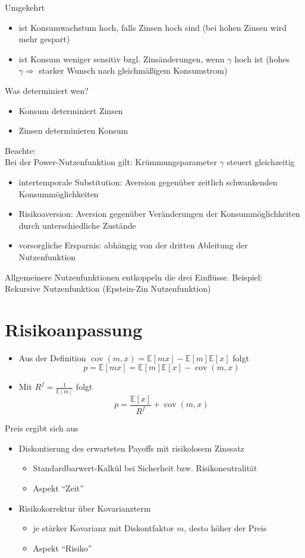 \documentclass[12pt]{extreport} %
\theoremstyle{named}
\theoremstyle{nnamed}
\theoremstyle{itshape}
\theoremstyle{normal}
\begin{document}
Umgekehrt
\begin{itemize}
	\item ist Konsumwachstum hoch, falls Zinsen hoch sind (bei hohen Zinsen wird mehr gespart)
	\item ist Konsum weniger sensitiv bzgl. Zinsänderungen, wenn $\gamma$ hoch ist (hohes $\gamma \Rightarrow$ starker Wunsch nach gleichmäßigem Konsumstrom)
\end{itemize}

Was determiniert wen?
\begin{itemize}
	\item Konsum determiniert Zinsen
	\item Zinsen determinieren Konsum
\end{itemize}

Beachte: ~\\
Bei der Power-Nutzenfunktion gilt: Krümmungsparameter $\gamma$ steuert gleichzeitig
\begin{itemize}
	\item intertemporale Substitution: Aversion gegenüber zeitlich schwankenden Konsummöglichkeiten
	\item Risikoaversion: Aversion gegenüber Veränderungen der Konsummöglichkeiten durch unterschiedliche Zustände
	\item vorsorgliche Ersparnis: abhängig von der dritten Ableitung der Nutzenfunktion
\end{itemize}
 Allgemeinere Nutzenfunktionen entkoppeln die drei Einflüsse. Beispiel: ~ Rekursive Nutzenfunktion (Epstein-Zin Nutzenfunktion) 

\section{Risikoanpassung}

\begin{itemize}
	\item Aus der Definition $\operatorname{cov}(m,x) = \mathbb{E}[mx] -  \mathbb{E}[m]  \mathbb{E}[x]$ folgt
		$$ p =  \mathbb{E}[mx] =  \mathbb{E}[m] \mathbb{E}[x] - \operatorname{cov}(m, x) $$
	\item Mit $R^f = \frac{1}{\mathbb{E}[m]}$ folgt
		$$ p = \frac{\mathbb{E}[x]}{R^f} + \operatorname{cov}(m, x) $$
\end{itemize}

Preis ergibt sich aus
\begin{itemize}
	\item Diskontierung des erwarteten Payoffs mit risikolosem Zinssatz
		\begin{itemize}
			\item Standardbarwert-Kalkül bei Sicherheit bzw. Risikoneutralität
			\item Aspekt \enquote{Zeit}
		\end{itemize}
	\item Risikokorrektur über Kovarianzterm
		\begin{itemize}
			\item je stärker Kovarianz mit Diskontfaktor $m$, desto höher der Preis
			\item Aspekt \enquote{Risiko}
		\end{itemize}
\end{itemize}
\end{document}
